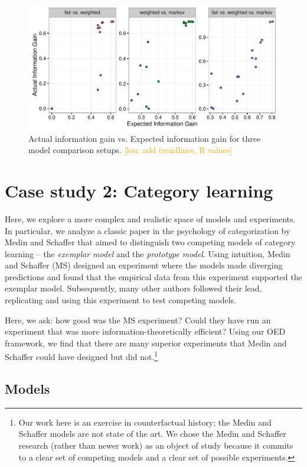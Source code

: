 \documentclass{article}
\newcommand{\lou}[1]{\textcolor{orange}{[lou: #1]}}
\begin{document}
\begin{figure}[h!]
\centering
\includegraphics[width=0.7\columnwidth]{img/coin_eig_aig_scatter_noText.pdf}
\caption{Actual information gain vs. Expected information gain for three model comparison setups. \lou{add trendlines, R values}}
\label{fig:aig_vs_eig}
\end{figure}

\section{Case study 2: Category learning}

Here, we explore a more complex and realistic space of models and experiments.
In particular, we analyze a classic paper in the psychology of categorization by Medin and Schaffer \cite{medin78:pr} that aimed to distinguish two competing models of category learning -- the \emph{exemplar model} and the \emph{prototype model}.
Using intuition, Medin and Schaffer (MS) designed an experiment where the models made diverging predictions and found that the empirical data from this experiment supported the exemplar model.
Subsequently, many other authors followed their lead, replicating and using this experiment to test competing models.

Here, we ask: how good was the MS experiment?
Could they have run an experiment that was more information-theoretically efficient?
Using our OED framework, we find that there are many superior experiments that Medin and Schaffer could have designed but did not.\footnote{Our work here is an exercise in counterfactual history; the Medin and Schaffer models are not state of the art. We chose the Medin and Schaffer research (rather than newer work) as an object of study because it commits to a clear set of competing models and a clear set of possible experiments.}



\subsection{Models}
\end{document}
